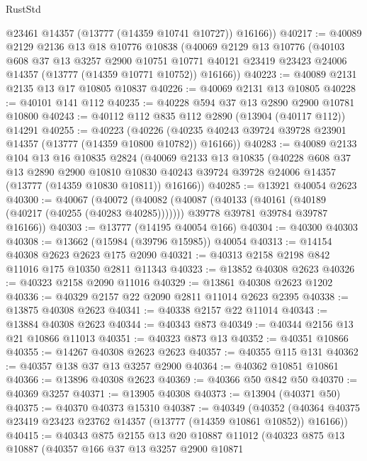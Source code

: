 \begin{lexlean}{RustStd}
\begin{coremodule}
        @23461
        @14357
        (@13777 (@14359 @10741 @10727))
        @16166))
@40217 := @40089
    @2129
    @2136
    @13
    @18
    @10776
    @10838
    (@40069
      @2129
      @13
      @10776
      (@40103
        @608
        @37
        @13
        @3257
        @2900
        @10751
        @10771
        @40121
        @23419
        @23423
        @24006
        @14357
        (@13777 (@14359 @10771 @10752))
        @16166))
@40223 := @40089 @2131 @2135 @13 @17 @10805 @10837
@40226 := @40069 @2131 @13 @10805
@40228 := @40101 @141 @112
@40235 := @40228 @594 @37 @13 @2890 @2900 @10781 @10800
@40243 := @40112 @112 @835 @112 @2890 (@13904 (@40117 @112)) @14291
@40255 := @40223
    (@40226 (@40235 @40243 @39724 @39728 @23901 @14357 (@13777 (@14359 @10800 @10782)) @16166))
@40283 := @40089
    @2133
    @104
    @13
    @16
    @10835
    @2824
    (@40069
      @2133
      @13
      @10835
      (@40228
        @608
        @37
        @13
        @2890
        @2900
        @10810
        @10830
        @40243
        @39724
        @39728
        @24006
        @14357
        (@13777 (@14359 @10830 @10811))
        @16166))
@40285 := @13921 @40054 @2623
@40300 := @40067
    (@40072
      (@40082
        (@40087 (@40133 (@40161 (@40189 (@40217 (@40255 (@40283 @40285)))))))
        @39778
        @39781
        @39784
        @39787
        @16166))
@40303 := @13777 (@14195 @40054 @166)
@40304 := @40300 @40303
@40308 := @13662 (@15984 (@39796 @15985)) @40054
@40313 := @14154 @40308 @2623 @2623 @175 @2090
@40321 := @40313 @2158 @2198 @842 @11016 @175 @10350 @2811 @11343
@40323 := @13852 @40308 @2623
@40326 := @40323 @2158 @2090 @11016
@40329 := @13861 @40308 @2623 @1202
@40336 := @40329 @2157 @22 @2090 @2811 @11014 @2623 @2395
@40338 := @13875 @40308 @2623
@40341 := @40338 @2157 @22 @11014
@40343 := @13884 @40308 @2623
@40344 := @40343 @873
@40349 := @40344 @2156 @13 @21 @10866 @11013
@40351 := @40323 @873 @13
@40352 := @40351 @10866
@40355 := @14267 @40308 @2623 @2623
@40357 := @40355 @115 @131
@40362 := @40357 @138 @37 @13 @3257 @2900
@40364 := @40362 @10851 @10861
@40366 := @13896 @40308 @2623
@40369 := @40366 @50 @842 @50
@40370 := @40369 @3257
@40371 := @13905 @40308
@40373 := @13904 (@40371 @50)
@40375 := @40370 @40373 @15310
@40387 := @40349
    (@40352 (@40364 @40375 @23419 @23423 @23762 @14357 (@13777 (@14359 @10861 @10852)) @16166))
@40415 := @40343
    @875
    @2155
    @13
    @20
    @10887
    @11012
    (@40323
      @875
      @13
      @10887
      (@40357
        @166
        @37
        @13
        @3257
        @2900
        @10871

\end{coremodule}
\end{lexlean}
